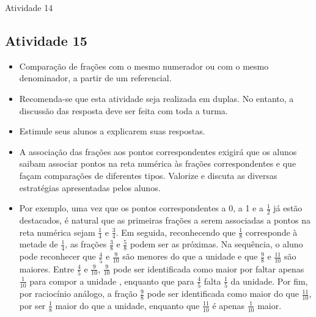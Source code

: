 \begin{multicols}{2}
\begin{resposta*}{Atividade 14}
\end{resposta*}


\subsection{Atividade 15}
  
\begin{itemize} %
    \item       Comparação de frações com o mesmo numerador ou com o mesmo denominador, a partir de um referencial.
\end{itemize} %
  
  
\begin{itemize}
    \item       Recomenda-se que esta atividade seja realizada em duplas. No entanto, a discussão das resposta deve ser feita com toda a turma.
    \item       Estimule seus alunos a explicarem suas respostas.
    \item       A associação das frações aos pontos correspondentes exigirá que os alunos saibam associar pontos na reta numérica às frações correspondentes e que façam comparações de diferentes tipos. Valorize e discuta as diversas estratégias apresentadas pelos alunos. 
    \item       Por exemplo, uma vez que os pontos correspondentes a 0, a 1 e a       $\frac{1}{2}$       já estão destacados, é natural que as primeiras frações a serem associadas a pontos na reta numérica sejam       $\frac{1}{4}$       e       $\frac{3}{4}$. Em seguida, reconhecendo que       $\frac{1}{8}$       corresponde à metade de       $\frac{1}{4}$,  as frações       $\frac{3}{8}$       e       $\frac{5}{8}$       podem ser as próximas.  Na sequência, o aluno pode reconhecer que       $\frac{4}{5}$       e       $\frac{9}{10}$       são menores do que a unidade e que       $\frac{9}{8}$       e       $\frac{11}{10}$       são maiores.  Entre       $\frac{4}{5}$       e       $\frac{9}{10}$,       $\frac{9}{10}$       pode ser identificada como maior por faltar  apenas       $\frac{1}{10}$       para compor a unidade , enquanto que para       $\frac{4}{5}$       falta       $\frac{1}{5}$       da unidade. Por fim, por raciocínio análogo, a fração       $\frac{9}{8}$       pode ser identificada como maior do que       $\frac{11}{10}$, por ser       $\frac{1}{8}$       maior do que a unidade, enquanto que       $\frac{11}{10}$       é apenas       $\frac{1}{10}$       maior. 

\end{itemize}
\end{multicols}
